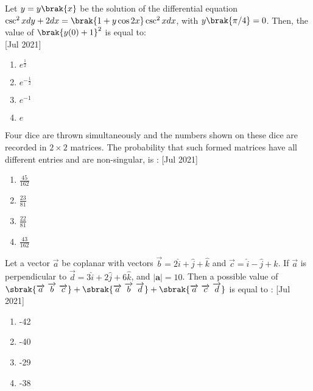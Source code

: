     \item{
     
            Let $y=y\brak{x}$ be the solution of the differential equation $\csc^2x dy + 2dx = \brak{1+y \cos 2x} \csc^2x dx$, with $y\brak{\pi/4} = 0$. Then, the value of $\brak{y(0)+1}^2$ is equal to: \\ \text{ }
            \hfill
            {[Jul 2021]}
            \begin{multicols}{4}
                \begin{enumerate}
                	\item $e^\frac{1}{2}$
                	\item $e^{-\frac{1}{2}}$
                	\item $e^{-1}$
                	\item $e$
                \end{enumerate}
            \end{multicols}
        
        }
    \item{
            Four dice are thrown simultaneously and the numbers shown on these dice are recorded in $2\times 2$
            matrices. The probability that such formed matrices have all different entries and are non-singular, is :
           	\hfill
                {[Jul 2021]}
            
            \begin{multicols}{4}
				\begin{enumerate}
					\item $\frac{45}{162}$
					\item $\frac{23}{81}$
					\item $\frac{22}{81}$
					\item $\frac{43}{162}$
				\end{enumerate}
			\end{multicols}
        
        }
 	\item{
        	Let a vector $\overrightarrow{a}$ be coplanar with vectors $\overrightarrow{b} = 2\hat{i} + \hat{j}  + \hat{k} $ and $\overrightarrow{c} = \hat{i}  - \hat{j}  + \hat{k} $. If $\overrightarrow{a}$ is perpendicular to $\overrightarrow{d} = 3\hat{i} + 2\hat{j} + 6\hat{k}$, and $|\textbf{a}| = 10$. Then a possible value of $\sbrak{\overrightarrow{a}\text{ }\overrightarrow{b}\text{ }\overrightarrow{c}}+\sbrak{\overrightarrow{a}\text{ }\overrightarrow{b}\text{ }\overrightarrow{d}}+\sbrak{\overrightarrow{a}\text{ }\overrightarrow{c}\text{ }\overrightarrow{d}} $ is equal to :\text{ }
        	\hfill
        	{[Jul 2021]}
        	
        	\begin{multicols}{4}
        		\begin{enumerate}
					\item -42
					
					\item -40
					
					\item -29
					\item -38
        		\end{enumerate}
        	\end{multicols}
        	
        }
